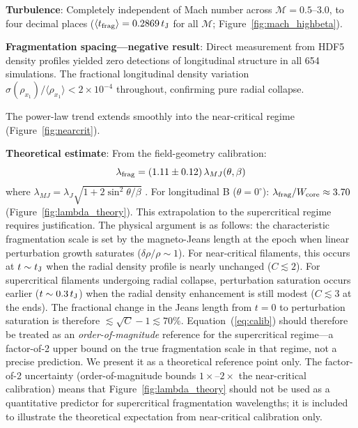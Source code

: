 \documentclass[twoside,twocolumn]{mnras}
\begin{document}
\textbf{Turbulence}: Completely independent of Mach number across $\mathcal{M} = 0.5$--$3.0$,
to four decimal places ($\langle t_{\rm frag} \rangle = 0.2869\,t_{\rm J}$ for all $\mathcal{M}$;
Figure~\ref{fig:mach_highbeta}).

\textbf{Fragmentation spacing---negative result}: Direct measurement from HDF5 density
profiles yielded zero detections of longitudinal structure in all 654 simulations.
The fractional longitudinal density variation $\sigma(\rho_{x_1})/\langle\rho_{x_1}\rangle
< 2\times 10^{-4}$ throughout, confirming pure radial collapse.

The power-law trend extends smoothly into the near-critical regime
(Figure~\ref{fig:nearcrit}).

\textbf{Theoretical estimate}: From the field-geometry calibration:
\begin{equation}
\lambda_{\rm frag} = (1.11 \pm 0.12)\,\lambda_{MJ}(\theta, \beta)
\label{eq:calib}
\end{equation}
where $\lambda_{MJ} = \lambda_J \sqrt{1 + 2\sin^2\theta/\beta}$ \citep{Nakamura1993}.
For longitudinal B ($\theta = 0^\circ$): $\lambda_{\rm frag}/W_{\rm core} \approx 3.70$
(Figure~\ref{fig:lambda_theory}).
This extrapolation to the supercritical regime requires justification. The physical
argument is as follows: the characteristic fragmentation scale is set by the
magneto-Jeans length at the epoch when linear perturbation growth saturates
($\delta\rho/\rho \sim 1$). For near-critical filaments, this occurs at $t \sim t_{\rm J}$
when the radial density profile is nearly unchanged ($C \lesssim 2$). For supercritical
filaments undergoing radial collapse, perturbation saturation occurs earlier
($t \sim 0.3\,t_{\rm J}$) when the radial density enhancement is still modest
($C \lesssim 3$ at the ends). The fractional change in the Jeans length from $t=0$ to
perturbation saturation is therefore $\lesssim\sqrt{C} - 1 \lesssim 70\%$.
Equation~(\ref{eq:calib}) should therefore be treated as an \textit{order-of-magnitude}
reference for the supercritical regime---a factor-of-2 upper bound on the true
fragmentation scale in that regime, not a precise prediction. We present it as a
theoretical reference point only.
The factor-of-2 uncertainty (order-of-magnitude bounds $1\times$--$2\times$ the near-critical calibration) means that Figure~\ref{fig:lambda_theory} should not be used as a quantitative predictor for supercritical fragmentation wavelengths; it is included to illustrate the theoretical expectation from near-critical calibration only.
\end{document}
